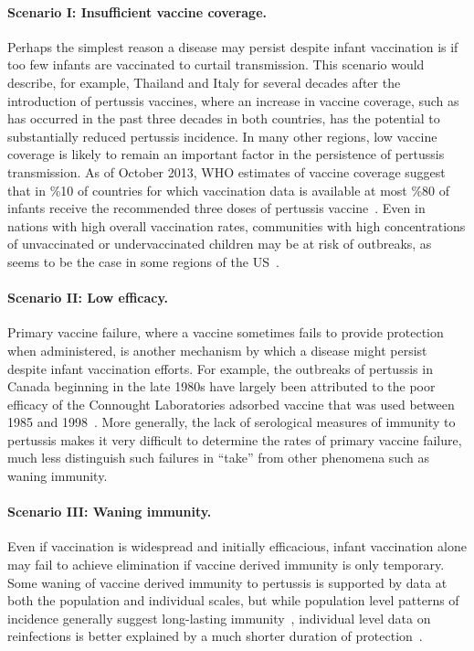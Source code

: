 \documentclass[12pt]{article}
\begin{document}
\paragraph{Scenario I: Insufficient vaccine coverage.}
Perhaps the simplest reason a disease may persist despite infant vaccination
is if too few infants are vaccinated to curtail transmission.
This scenario would describe, for example, 
Thailand and Italy for several decades after the introduction of pertussis vaccines,
where an increase in vaccine coverage, such as has occurred in the past three decades in both countries,
has the potential to substantially reduced pertussis incidence.
In many other regions, low vaccine coverage is likely to remain an important factor in 
the persistence of pertussis transmission.
As of October 2013, WHO estimates of vaccine coverage suggest that in \%10 of countries for which vaccination data is available
at most \%80 of infants receive the recommended three doses of pertussis vaccine~\cite{WHO:2013}.
Even in nations with high overall vaccination rates, 
communities with high concentrations of unvaccinated or undervaccinated children
may be at risk of outbreaks, as seems to be the case in some regions of the US~\cite{Omer:2009}.

\paragraph{Scenario II: Low efficacy.}
Primary vaccine failure, where a vaccine sometimes fails to provide protection when administered,
is another mechanism by which a disease might persist despite infant vaccination efforts.
For example, the outbreaks of pertussis in Canada beginning in the late 1980s
have largely been attributed to the 
poor efficacy of the Connought Laboratories adsorbed vaccine
that was used between 1985 and 1998~\cite{Halperin_et:1989, Ntezayabo_et:2003}.
More generally, the lack of serological measures of immunity to pertussis
makes it very difficult to determine the rates of primary vaccine failure,
much less distinguish such failures in ``take'' from other phenomena such as 
waning immunity.

\paragraph{Scenario III: Waning immunity.}
Even if vaccination is widespread and initially efficacious, 
infant vaccination alone may fail to achieve elimination if vaccine derived immunity is only temporary.
Some waning of vaccine derived immunity to pertussis is supported by
data at both the population and individual scales,
but while population level patterns of incidence generally suggest long-lasting immunity~\cite{Wearing&Rohani:2009},
individual level data on reinfections is better explained by a much shorter duration of protection~\cite{Jenkinson:1988}.
\end{document}
